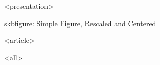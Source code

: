 \mode
<presentation>

\begin{frame}{skbfigure: Simple Figure, Rescaled and Centered}
  \label{exa:simple}


\end{frame}

\mode
<article>

\bigskip

\nocite{vandermeer-sven:inproceedings:in:2000}

\mode
<all>